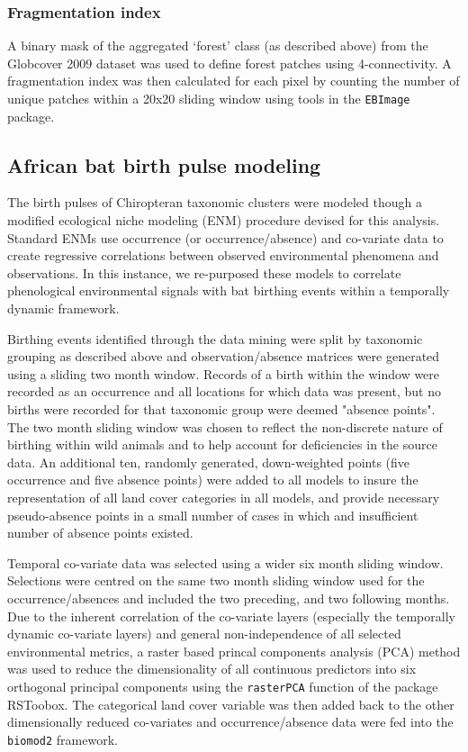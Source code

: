 \documentclass[9pt,twoside,lineno]{pnas-new}
\begin{document}
\subsubsection*{Fragmentation index}
A binary mask of the aggregated `forest' class (as described above) from the Globcover 2009 dataset \cite{Olivier2012Global2009} was used to define forest patches using 4-connectivity. A fragmentation index was then calculated for each pixel by counting the number of unique patches within a 20x20 sliding window using tools in the \texttt{EBImage} package. \par
\subsection*{African bat birth pulse modeling}
\label{biomod}
The birth pulses of Chiropteran taxonomic clusters were modeled though a modified ecological niche modeling (ENM) procedure devised for this analysis. Standard ENMs use occurrence (or occurrence/absence) and co-variate data to create regressive correlations between observed environmental phenomena and observations. In this instance, we re-purposed these models to correlate phenological environmental signals with bat birthing events within a temporally dynamic framework.\par
Birthing events identified through the data mining were split by taxonomic grouping as described above and observation/absence matrices were generated using a sliding two month window. Records of a birth within the window were recorded as an occurrence and all locations for which data was present, but no births were recorded for that taxonomic group were deemed "absence points". The two month sliding window was chosen to reflect the non-discrete nature of birthing within wild animals and to help account for deficiencies in the source data. An additional ten, randomly generated, down-weighted points (five occurrence and five absence points) were added to all models to insure the representation of all land cover categories in all models, and provide necessary pseudo-absence points in a small number of cases in which and insufficient number of absence points existed.\par
Temporal co-variate data was selected using a wider six month sliding window. Selections were centred on the same two month sliding window used for the occurrence/absences and included the two preceding, and two following months. Due to the inherent correlation of the co-variate layers (especially the temporally dynamic co-variate layers) and general non-independence of all selected environmental metrics, a raster based princal components analysis (PCA) method was used to reduce the dimensionality of all continuous predictors into six orthogonal principal components using the \texttt{rasterPCA} function of the package RSToobox. The categorical land cover variable was then added back to the other dimensionally reduced co-variates and occurrence/absence data were fed into the \texttt{biomod2} framework.\par
\end{document}
